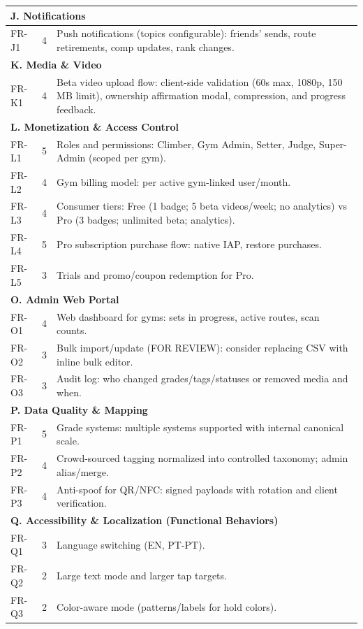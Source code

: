 \documentclass[12pt,a4paper]{report}
\renewcommand\_{\textunderscore\hspace{0pt}}
\begin{document}
\begin{longtable}{l c >{\raggedright\arraybackslash}p{11cm}}
\hline
\multicolumn{3}{l}{\textbf{J. Notifications}} \\
\hline
FR-J1 & 4 & Push notifications (topics configurable): friends' sends, route retirements, comp updates, rank changes. \\

\hline
\multicolumn{3}{l}{\textbf{K. Media \& Video}} \\
\hline
FR-K1 & 4 & Beta video upload flow: client-side validation (60s max, 1080p, 150\,MB limit), ownership affirmation modal, compression, and progress feedback. \\

\hline
\multicolumn{3}{l}{\textbf{L. Monetization \& Access Control}} \\
\hline
FR-L1 & 5 & Roles and permissions: Climber, Gym Admin, Setter, Judge, Super-Admin (scoped per gym). \\
FR-L2 & 4 & Gym billing model: \texteuro 0.50 per active gym-linked user/month. \\
FR-L3 & 4 & Consumer tiers: Free (1 badge; 5 beta videos/week; no analytics) vs Pro (3 badges; unlimited beta; analytics). \\
FR-L4 & 5 & Pro subscription purchase flow: native IAP, restore purchases. \\
FR-L5 & 3 & Trials and promo/coupon redemption for Pro. \\

\hline
\multicolumn{3}{l}{\textbf{O. Admin Web Portal}} \\
\hline
FR-O1 & 4 & Web dashboard for gyms: sets in progress, active routes, scan counts. \\
FR-O2 & 3 & Bulk import/update (FOR REVIEW): consider replacing CSV with inline bulk editor. \\
FR-O3 & 3 & Audit log: who changed grades/tags/statuses or removed media and when. \\

\hline
\multicolumn{3}{l}{\textbf{P. Data Quality \& Mapping}} \\
\hline
FR-P1 & 5 & Grade systems: multiple systems supported with internal canonical scale. \\
FR-P2 & 4 & Crowd-sourced tagging normalized into controlled taxonomy; admin alias/merge. \\
FR-P3 & 4 & Anti-spoof for QR/NFC: signed payloads with rotation and client verification. \\

\hline
\multicolumn{3}{l}{\textbf{Q. Accessibility \& Localization (Functional Behaviors)}} \\
\hline
FR-Q1 & 3 & Language switching (EN, PT-PT). \\
FR-Q2 & 2 & Large text mode and larger tap targets. \\
FR-Q3 & 2 & Color-aware mode (patterns/labels for hold colors). \\

\hline
\end{longtable}
\normalsize
\end{document}
